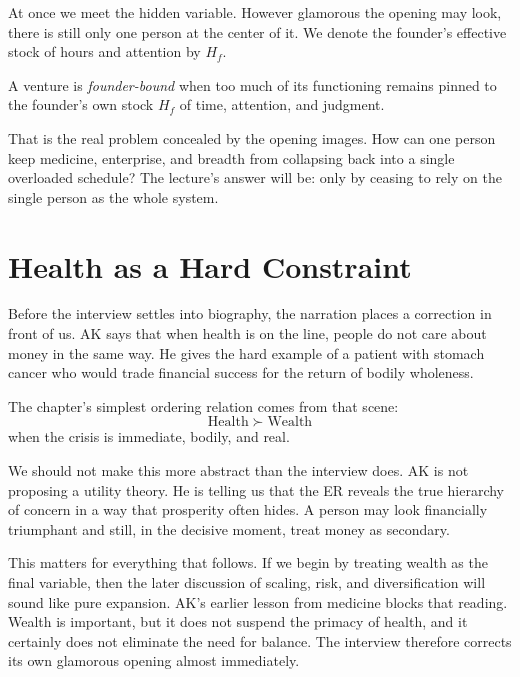 At once we meet the hidden variable. However glamorous the opening may look, there is still only one person at the center of it. We denote the founder's effective stock of hours and attention by \(H_f\).

\begin{definition}
A venture is \emph{founder-bound} when too much of its functioning remains pinned to the founder's own stock \(H_f\) of time, attention, and judgment.
\end{definition}

That is the real problem concealed by the opening images. How can one person keep medicine, enterprise, and breadth from collapsing back into a single overloaded schedule? The lecture's answer will be: only by ceasing to rely on the single person as the whole system.

\section{Health as a Hard Constraint}

Before the interview settles into biography, the narration places a correction in front of us. AK says that when health is on the line, people do not care about money in the same way. He gives the hard example of a patient with stomach cancer who would trade financial success for the return of bodily wholeness.

The chapter's simplest ordering relation comes from that scene:
\begin{equation}
\mathrm{Health} \succ \mathrm{Wealth}
\end{equation}
when the crisis is immediate, bodily, and real.

We should not make this more abstract than the interview does. AK is not proposing a utility theory. He is telling us that the ER reveals the true hierarchy of concern in a way that prosperity often hides. A person may look financially triumphant and still, in the decisive moment, treat money as secondary.

This matters for everything that follows. If we begin by treating wealth as the final variable, then the later discussion of scaling, risk, and diversification will sound like pure expansion. AK's earlier lesson from medicine blocks that reading. Wealth is important, but it does not suspend the primacy of health, and it certainly does not eliminate the need for balance. The interview therefore corrects its own glamorous opening almost immediately.

